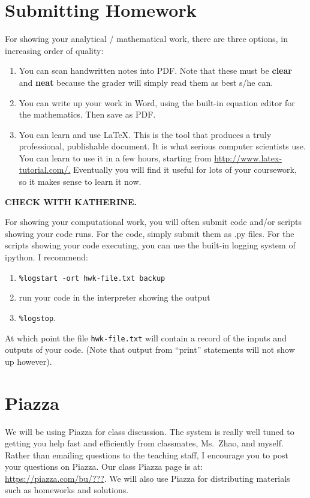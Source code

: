 \documentclass[11pt]{article}
\begin{document}
\section*{Submitting Homework}
For showing your analytical / mathematical work, there are three
options, in increasing order of quality:
\begin{enumerate}
\item You can scan handwritten notes into PDF.    Note that these must
  be \textbf{clear} and \textbf{neat} because the grader will simply
  read them as best s/he can.
\item You can write up your work in Word, using the built-in equation
  editor for the mathematics.   Then save as PDF.   
\item You can learn and use \LaTeX.   This is the tool that produces a
  truly professional, publishable document.   It is what serious
  computer scientists use.  You can learn to use it in a few hours,
  starting from \url{http://www.latex-tutorial.com/.}   Eventually you will
  find it useful for lots of your coursework, so it makes sense to learn it
  now. 
\end{enumerate}


\textbf{CHECK WITH KATHERINE.}

For showing your computational work, you will often submit code 
and/or scripts showing your code runs.   For the code, simply
submit them as .py files.   For the scripts showing your code executing,
you can use the built-in logging system of ipython.   I recommend: 
\begin{enumerate}
\item \verb$%logstart -ort hwk-file.txt backup$
\item run your code in the interpreter showing the output
\item \verb$%logstop$.
\end{enumerate}
At which point the file \texttt{hwk-file.txt} will contain a record of
the inputs and outputs of your code.   (Note that output from ``print'' statements
will not show up however). 

\section*{Piazza}

We will be using Piazza for class discussion. The system is really well
tuned to getting you help fast and efficiently from classmates, Ms.\ Zhao,
and myself. Rather than emailing questions to the teaching staff,
I encourage you to post your questions on Piazza.   Our class Piazza
page  is at: \url{https://piazza.com/bu/???}. 
We will also use Piazza for distributing materials
such as homeworks and solutions.
\end{document}
